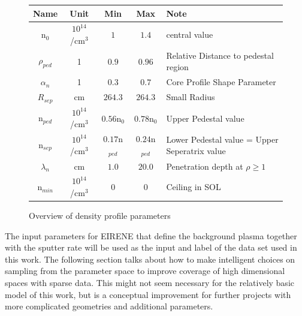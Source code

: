 		\begin{figure}
			\caption{Overview of density profile parameters}
			\begin{tabular}[width=\textwidth]{c|c|c|c|l}
				Name & Unit & Min & Max & Note \\
				\hline
				n$_0$ & $10^{14}$/cm$^3$ & $1$ &  $1.4$ & central value \\
				$\rho_{ped}$ & 1 & $0.9$ &  $0.96$ & Relative Distance to pedestal region \\
				$\alpha_{n}$ & 1 & $0.3$ &  $0.7$ & Core Profile Shape Parameter \\
				$R_{sep}$ & cm & $264.3$ &  $264.3$ & Small Radius \\
				n$_{ped}$ & $10^{14}$/cm$^3$ & $0.56$n$_0$ &  $0.78$n$_0$ & Upper Pedestal value \\
				n$_{sep}$ & $10^{14}$/cm$^3$ & $0.17$n$_{ped}$ &  $0.24$n$_{ped}$ & Lower Pedestal value = Upper Seperatrix value \\
				$\lambda_n$ & cm & $1.0$ &  $20.0$ & Penetration depth at $\rho \ge 1$\\
				n$_{min}$ & $10^{14}$/cm$^3$ & $0$ &  $0$ & Ceiling in SOL\\
			\end{tabular}
			\label{Tab:Parametern}
		\end{figure}
		
		The input parameters for EIRENE that define the background plasma together with the sputter rate will be used as the input and label of the data set used in this work. The following section talks about how to make intelligent choices on sampling from the parameter space to improve coverage of high dimensional spaces with sparse data. This might not seem necessary for the relatively basic model of this work, but is a conceptual improvement for further projects with more complicated geometries and additional parameters.
		

